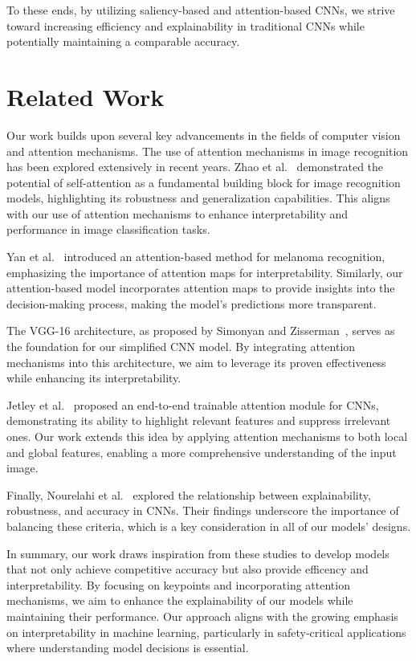 To these ends, by utilizing saliency-based and attention-based CNNs, we strive toward increasing efficiency and explainability in traditional CNNs while potentially maintaining a comparable accuracy. 

\section{Related Work}

Our work builds upon several key advancements in the fields of computer vision and attention mechanisms. The use of attention mechanisms in image recognition has been explored extensively in recent years. Zhao et al.~\cite{zhao2020exploringselfattentionimagerecognition} demonstrated the potential of self-attention as a fundamental building block for image recognition models, highlighting its robustness and generalization capabilities. This aligns with our use of attention mechanisms to enhance interpretability and performance in image classification tasks.

Yan et al.~\cite{10.1007/978-3-030-20351-1_62} introduced an attention-based method for melanoma recognition, emphasizing the importance of attention maps for interpretability. Similarly, our attention-based model incorporates attention maps to provide insights into the decision-making process, making the model's predictions more transparent.

The VGG-16 architecture, as proposed by Simonyan and Zisserman~\cite{simonyan2015deepconvolutionalnetworkslargescale}, serves as the foundation for our simplified CNN model. By integrating attention mechanisms into this architecture, we aim to leverage its proven effectiveness while enhancing its interpretability.

Jetley et al.~\cite{jetley2018learnpayattention} proposed an end-to-end trainable attention module for CNNs, demonstrating its ability to highlight relevant features and suppress irrelevant ones. Our work extends this idea by applying attention mechanisms to both local and global features, enabling a more comprehensive understanding of the input image.

Finally, Nourelahi et al.~\cite{nourelahi2023explainableadversariallyrobustcnns} explored the relationship between explainability, robustness, and accuracy in CNNs. Their findings underscore the importance of balancing these criteria, which is a key consideration in all of our models' designs.

In summary, our work draws inspiration from these studies to develop models that not only achieve competitive accuracy but also provide efficency and interpretability. By focusing on keypoints and incorporating attention mechanisms, we aim to enhance the explainability of our models while maintaining their performance. Our approach aligns with the growing emphasis on interpretability in machine learning, particularly in safety-critical applications where understanding model decisions is essential.

